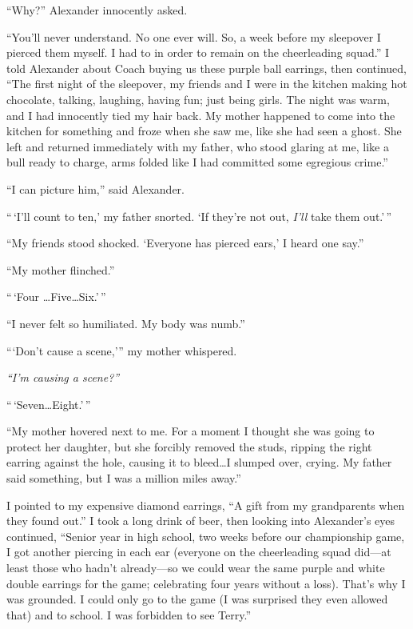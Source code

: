 ``Why?'' Alexander innocently asked.

``You'll never understand. No one ever will. So, a week before my
sleepover I pierced them myself. I had to in order to remain on the
cheerleading squad.'' I told Alexander about Coach buying us these
purple ball earrings, then continued, ``The first night of the
sleepover, my friends and I were in the kitchen making hot chocolate,
talking, laughing, having fun; just being girls. The night was warm, and
I had innocently tied my hair back. My mother happened to come into the
kitchen for something and froze when she saw me, like she had seen a
ghost. She left and returned immediately with my father, who stood
glaring at me, like a bull ready to charge, arms folded like I had
committed some egregious crime.''

``I can picture him,'' said Alexander.

``\,`I'll count to ten,' my father snorted. `If they're not out,
\emph{I'll} take them out.'\,''

``My friends stood shocked. `Everyone has pierced ears,' I heard one
say.''

``My mother flinched.''

``\,`Four \ldots Five\ldots Six.'\,''

``I never felt so humiliated. My body was numb.''

```Don't cause a scene,''' my mother whispered.

\emph{``I'm causing a scene?''}

``\,`Seven\ldots Eight.'\,''

``My mother hovered next to me. For a moment I thought she was going to
protect her daughter, but she forcibly removed the studs, ripping the
right earring against the hole, causing it to bleed\ldots I slumped
over, crying. My father said something, but I was a million miles
away.''

I pointed to my expensive diamond earrings, ``A gift from my
grandparents when they found out.'' I took a long drink of beer, then
looking into Alexander's eyes continued, ``Senior year in high school,
two weeks before our championship game, I got another piercing in each
ear (everyone on the cheerleading squad did---at least those who hadn't
already---so we could wear the same purple and white double earrings for
the game; celebrating four years without a loss). That's why I was
grounded. I could only go to the game (I was surprised they even allowed
that) and to school. I was forbidden to see Terry.''

